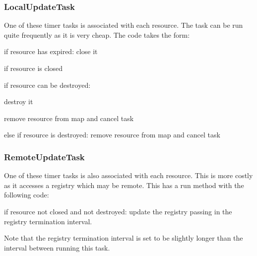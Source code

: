 \subsubsection{LocalUpdateTask}
One of these timer tasks is associated with each resource. The task can be run
quite frequently as it is very cheap. The code takes the form:

\begin{code}
\item if resource has expired: close it
\item if resource is closed
\begin{code}
\item if resource can be destroyed:
\begin{code}
\item destroy it
\item remove resource from map and cancel task
\end{code}
\end{code}
\item else if resource is destroyed: remove resource from map and cancel task
\end{code}

\subsubsection{RemoteUpdateTask}
One of these timer tasks is also associated with each resource. This is more
costly as it accesses a registry which may be remote. This has a run method with
the following code:
		
\begin{code}
\item if resource not closed and not destroyed: update the registry passing in
the registry termination interval.
\end{code}

Note that the registry termination interval is set to be slightly longer than
the interval between running this task.



